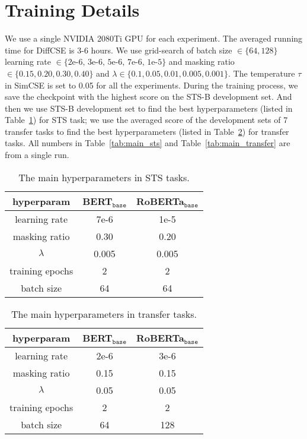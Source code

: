 \documentclass[11pt]{article}
\newcommand{\ba}{$_\texttt{base}$\xspace}
\begin{document}
\section{Training Details}
\label{sec:appendix}
We use a single NVIDIA 2080Ti GPU for each experiment. The averaged running time for DiffCSE is 3-6 hours. We use grid-search of batch size $\in \{64, 128\}$ learning rate $\in \{\text{2e-6, 3e-6, 5e-6, 7e-6, 1e-5}\}$ and masking ratio $\in \{0.15, 0.20, 0.30, 0.40\}$ and $\lambda \in \{0.1, 0.05, 0.01, 0.005, 0.001\}$. The temperature $\tau$ in SimCSE is set to 0.05 for all the experiments.
During the training process, we save the checkpoint with the highest score on the STS-B development set. And then we use STS-B development set to find the best hyperparameters (listed in Table~\ref{tab:hyper_sts}) for STS task; we use the averaged score of the development sets of 7 transfer tasks to find the best hyperparameters (listed in Table~\ref{tab:hyper_trans}) for transfer tasks. All numbers in Table~\ref{tab:main_sts} and Table~\ref{tab:main_transfer} are from a single run.
\begin{table}[h!]
\centering
\small
\setlength\tabcolsep{3pt}
\begin{tabular}{ccc}
\toprule
\bf hyperparam & \bf BERT\ba & \bf RoBERTa\ba\\
\midrule
learning rate & 7e-6 & 1e-5\\
masking ratio & 0.30 & 0.20 \\
$\lambda$ & 0.005 & 0.005 \\
training epochs & 2 & 2 \\
batch size & 64 & 64 \\
\bottomrule
\end{tabular}
\caption{The main hyperparameters in STS tasks.}
\label{tab:hyper_sts}
\end{table}

\begin{table}[h!]
\centering
\small
\setlength\tabcolsep{3pt}
\begin{tabular}{ccc}
\toprule
\bf hyperparam & \bf BERT\ba & \bf RoBERTa\ba\\
\midrule
learning rate & 2e-6 & 3e-6\\
masking ratio & 0.15 & 0.15 \\
$\lambda$ & 0.05 & 0.05 \\
training epochs & 2 & 2 \\
batch size & 64 & 128 \\
\bottomrule
\end{tabular}
\caption{The main hyperparameters in transfer tasks.}
\label{tab:hyper_trans}
\end{table}
\end{document}
